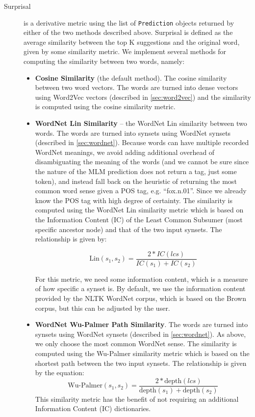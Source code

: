 \begin{description}
        \item[Surprisal] is a derivative metric using the list of \texttt{Prediction} objects returned by either of the two methods described above. Surprisal is defined as the average similarity between the top K suggestions and the original word, given by some similarity metric. We implement several methods for computing the similarity between two words, namely:
        \begin{itemize}
            \item \textbf{Cosine Similarity} (the default method). The cosine similarity between two word vectors. The words are turned into dense vectors using Word2Vec vectors (described in \ref{sec:word2vec}) and the similarity is computed using the cosine similarity metric.
            \item \textbf{WordNet Lin Similarity} -- the WordNet Lin similarity between two words. The words are turned into synsets using WordNet synsets (described in \ref{sec:wordnet}). Because words can have multiple recorded WordNet meanings, we avoid adding additional overhead of disambiguating the meaning of the words (and we cannot be sure since the nature of the MLM prediction does not return a tag, just some token), and instead fall back on the heuristic of returning the most common word sense given a POS tag, e.g. ``fox.n.01''. Since we already know the POS tag with high degree of certainty. The similarity is computed using the WordNet Lin similarity metric which is based on the Information Content (IC) of the Least Common Subsumer (most specific ancestor node) and that of the two input synsets. The relationship is given by:
            
            \begin{equation}
                \text{Lin}(s_1, s_2) = \frac{2 * IC(lcs)}{IC(s_1) + IC(s_2)}
            \end{equation}

            For this metric, we need some information content, which is a measure of how specific a synset is. By default, we use the information content provided by the NLTK WordNet corpus, which is based on the Brown corpus, but this can be adjusted by the user.

            \item \textbf{WordNet Wu-Palmer Path Similarity}. The words are turned into synsets using WordNet synsets (described in \ref{sec:wordnet}). As above, we only choose the most common WordNet sense. The similarity is computed using the Wu-Palmer similarity metric which is based on the shortest path between the two input synsets. The relationship is given by the equation:
            \begin{equation}
                \text{Wu-Palmer}(s_1, s_2) = \frac{2 * \text{depth}(lcs)}{\text{depth}(s_1) + \text{depth}(s_2)}
            \end{equation}
            This similarity metric has the benefit of not requiring an additional Information Content (IC) dictionaries.
        \end{itemize}


\end{description}
